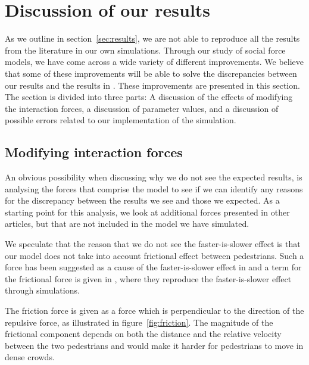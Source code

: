 \section{Discussion of our results}
\label{sec:discussion}
As we outline in section~\ref{sec:results}, we are not able to reproduce all 
the results from the literature in our own simulations.  Through our study of 
social force models, we have come across a wide variety of different 
improvements. We believe that some of these improvements will be able to solve 
the discrepancies between our results and the results in \cite{self-org}.  
These improvements are presented in this section.  The section is divided into 
three parts: A discussion of the effects of modifying  the interaction forces, 
a discussion of parameter values, and a discussion of possible errors related 
to our implementation of the simulation.

\subsection{Modifying interaction forces}
\label{sec:new-forces}
An obvious possibility when discussing why we do not see the expected results, 
is analysing the forces that comprise the model to see if we can identify any 
reasons for the discrepancy between the results we see and those we expected.  
As a starting point for this analysis, we look at additional forces presented 
in other articles, but that are not included in the model we have simulated.

We speculate that the reason that we do not see the faster-is-slower effect is 
that our model does not take into account frictional effect between 
pedestrians.  Such a force has been suggested as a cause of the 
faster-is-slower effect in \cite{HelbingNew} and a term for the frictional 
force is given in \cite{helbing00}, where they reproduce the faster-is-slower 
effect through simulations. 

The friction force is given as a force which is perpendicular to the direction 
of the repulsive force, as illustrated in  figure~\ref{fig:friction}. The 
magnitude of the frictional component depends on both the distance and the 
relative velocity between the two pedestrians and would make it harder for 
pedestrians to move in dense crowds.

